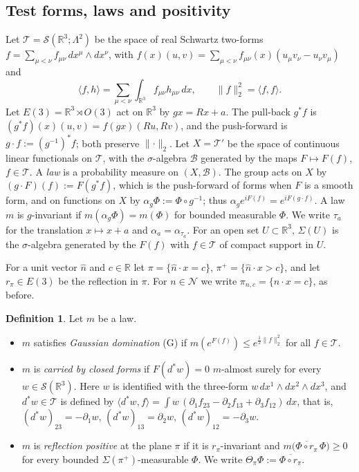 \documentclass[11pt]{amsart}
\theoremstyle{plain}
\theoremstyle{definition}
\newtheorem{definition}[theorem]{Definition}
\theoremstyle{remark}
\numberwithin{equation}{section}
\newcommand{\R}{\mathbb{R}}
\newcommand{\cB}{\mathcal{B}}
\newcommand{\cN}{\mathcal{N}}
\newcommand{\cT}{\mathcal{T}}
\newcommand{\cS}{\mathcal{S}}
\newcommand{\Eu}{E(3)}
\newcommand{\norm}[1]{\lVert #1\rVert}
\newcommand{\ip}[2]{\langle #1,#2\rangle}
\begin{document}
\subsection{Test forms, laws and positivity}\label{ssec:laws}
Let $\cT=\cS(\R^3;\Lambda^2)$ be the space of real Schwartz two-forms $f=\sum_{\mu<\nu}f_{\mu\nu}\,dx^\mu\wedge dx^\nu$, with $f(x)(u,v)=\sum_{\mu<\nu}f_{\mu\nu}(x)(u_\mu v_\nu-u_\nu v_\mu)$ and
\[
\ip fh=\sum_{\mu<\nu}\int_{\R^3}f_{\mu\nu}h_{\mu\nu}\,dx,\qquad\norm f_2^2=\ip ff .
\]
Let $\Eu=\R^3\rtimes O(3)$ act on $\R^3$ by $gx=Rx+a$. The pull-back $g^*f$ is $(g^*f)(x)(u,v)=f(gx)(Ru,Rv)$, and the push-forward is $g\cdot f:=(g^{-1})^*f$; both preserve $\norm\cdot_2$. Let $X=\cT'$ be the space of continuous linear functionals on $\cT$, with the $\sigma$-algebra $\cB$ generated by the maps $F\mapsto F(f)$, $f\in\cT$. A \emph{law} is a probability measure on $(X,\cB)$. The group acts on $X$ by $(g\cdot F)(f):=F(g^*f)$, which is the push-forward of forms when $F$ is a smooth form, and on functions on $X$ by $\alpha_g\Phi:=\Phi\circ g^{-1}$; thus $\alpha_ge^{iF(f)}=e^{iF(g\cdot f)}$. A law $m$ is $g$-invariant if $m(\alpha_g\Phi)=m(\Phi)$ for bounded measurable $\Phi$. We write $\tau_a$ for the translation $x\mapsto x+a$ and $\alpha_a=\alpha_{\tau_a}$. For an open set $U\subset\R^3$, $\Sigma(U)$ is the $\sigma$-algebra generated by the $F(f)$ with $f\in\cT$ of compact support in $U$.

For a unit vector $\hat n$ and $c\in\R$ let $\pi=\{\hat n\cdot x=c\}$, $\pi^+=\{\hat n\cdot x>c\}$, and let $r_\pi\in\Eu$ be the reflection in $\pi$. For $n\in\cN$ we write $\pi_{n,c}=\{n\cdot x=c\}$, as before.

\begin{definition}\label{def:laws}
Let $m$ be a law.
\begin{itemize}
\item[(a)] $m$ satisfies \emph{Gaussian domination} (G) if $m(e^{F(f)})\le e^{\frac12\norm f_2^2}$ for all $f\in\cT$.
\item[(b)] $m$ is \emph{carried by closed forms} if $F(d^*w)=0$ $m$-almost surely for every $w\in\cS(\R^3)$. Here $w$ is identified with the three-form $w\,dx^1\wedge dx^2\wedge dx^3$, and $d^*w\in\cT$ is defined by $\ip{d^*w}f=\int w\,(\partial_1f_{23}-\partial_2f_{13}+\partial_3f_{12})\,dx$, that is, $(d^*w)_{23}=-\partial_1w$, $(d^*w)_{13}=\partial_2w$, $(d^*w)_{12}=-\partial_3w$.
\item[(c)] $m$ is \emph{reflection positive} at the plane $\pi$ if it is $r_\pi$-invariant and $m\big(\overline{\Phi\circ r_\pi}\,\Phi\big)\ge0$ for every bounded $\Sigma(\pi^+)$-measurable $\Phi$. We write $\Theta_\pi\Phi:=\overline{\Phi\circ r_\pi}$.
\end{itemize}
\end{definition}
\end{document}

